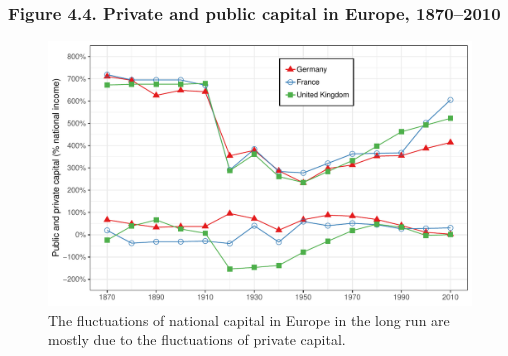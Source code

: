 \documentclass[t]{beamer}\usepackage[]{graphicx}\usepackage[]{color}
\newenvironment{knitrout}{}{} %
\begin{document}
\begin{frame}[label=Figure_4_4]
\frametitle{Figure 4.4. Private and public capital in Europe, 1870--2010}
\begin{figure}[t]
\begin{minipage}[b]{\textwidth}
\centering
\begin{knitrout}\footnotesize
{}\color{fgcolor}

{\centering \includegraphics[width=1\linewidth]{figures/color/Figure_4_4} 

}



\end{knitrout}
\caption{The fluctuations of national capital in Europe in the long run are mostly due to the fluctuations of private capital.}
\end{minipage}
\end{figure}
\end{frame}
\end{document}
